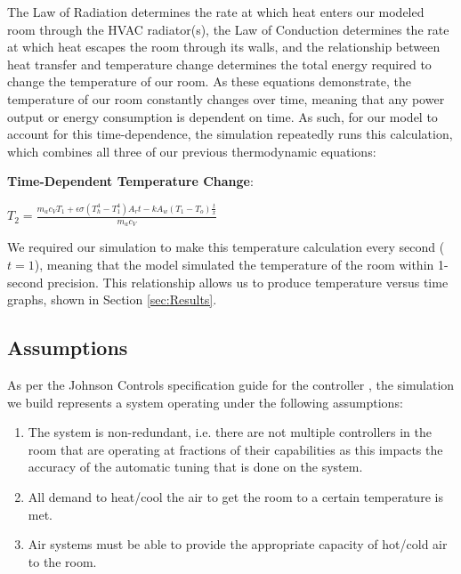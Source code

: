 \documentclass[conference,letterpaper]{IEEEtran}
\begin{document}
The Law of Radiation determines the rate at which heat enters our modeled room through the HVAC radiator(s), the Law of Conduction determines the rate at which heat escapes the room through its walls, and the relationship between heat transfer and temperature change determines the total energy required to change the temperature of our room. As these equations demonstrate, the temperature of our room constantly changes over time, meaning that any power output or energy consumption is dependent on time. As such, for our model to account for this time-dependence, the simulation repeatedly runs this calculation, which combines all three of our previous thermodynamic equations:

\textbf{Time-Dependent Temperature Change}:

$T_2=\frac{m_ac_VT_1 + \epsilon\sigma(T_h^4-T_1^4)A_rt - kA_w(T_1-T_o)\frac{t}{x}}{m_ac_V}$

We required our simulation to make this temperature calculation every second ($t=1$), meaning that the model simulated the temperature of the room within 1-second precision. This relationship allows us to produce temperature versus time graphs, shown in Section \ref{sec:Results}.

\subsection{Assumptions}
\label{sec: Assumptions}
As per the Johnson Controls specification guide for the controller \cite{johnsoncontrolsPRAC}, the simulation we build represents a system operating under the following assumptions:
\begin{enumerate}
    \item The system is non-redundant, i.e. there are not multiple controllers in the room that are operating at fractions of their capabilities as this impacts the accuracy of the automatic tuning that is done on the system.
    \item All demand to heat/cool the air to get the room to a certain temperature is met.
    \item Air systems must be able to provide the appropriate capacity of hot/cold air to the room.
\end{enumerate}
\end{document}
